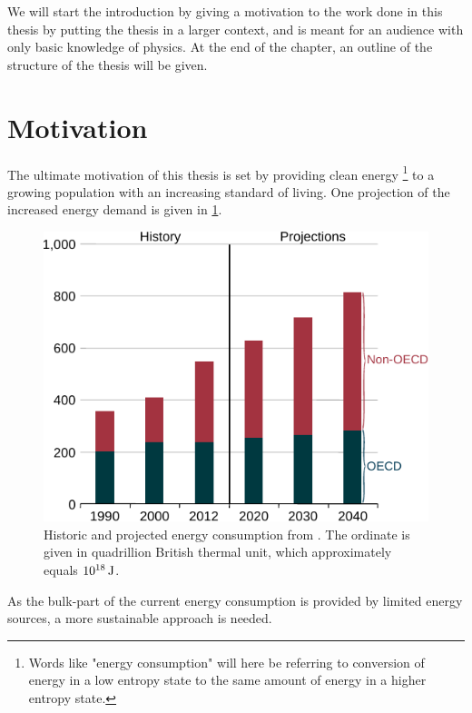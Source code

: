 %
We will start the introduction by giving a motivation to the work done in this thesis by putting the thesis in a larger context, and is meant for an audience with only basic knowledge of physics.
At the end of the chapter, an outline of the structure of the thesis will be given.

\section{Motivation}
%
The ultimate motivation of this thesis is set by providing clean energy%
\footnote{Words like "energy consumption" will here be referring to conversion of energy in a low entropy state to the same amount of energy in a higher entropy state.}
%
to a growing population with an increasing standard of living.
One projection of the increased energy demand is given in \cref{fig:energyDemand}.
%
\begin{figure}[htb]
    \begin{center}
        \includegraphics{fig/intro/energyDemand}
    \end{center}
    \caption{Historic and projected energy consumption from \cite{UEIA2016book}.
    The ordinate is given in quadrillion British thermal unit, which approximately equals $10^{18} \, \text{J}$.
    }
    \label{fig:energyDemand}
\end{figure}

\noindent
As the bulk-part of the current energy consumption is provided by limited energy sources, a more sustainable approach is needed.

